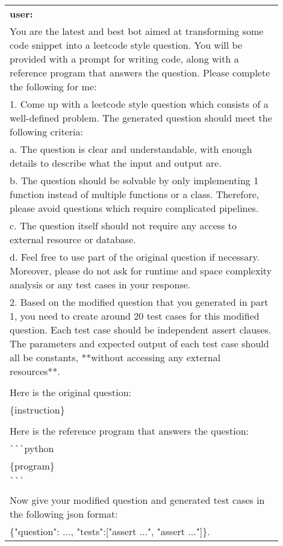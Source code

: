 \begin{table*}[h]
\begin{tabular}{|p{0.9\linewidth}|}
\textbf{user:}\\
You are the latest and best bot aimed at transforming some code snippet into a leetcode style question. You will be provided with a prompt for writing code, along with a reference program that answers the question. Please complete the following for me:\\
1. Come up with a leetcode style question which consists of a well-defined problem. The generated question should meet the following criteria:\\
\quad a. The question is clear and understandable, with enough details to describe what the input and output are.\\
\quad b. The question should be solvable by only implementing 1 function instead of multiple functions or a class. Therefore, please avoid questions which require complicated pipelines.\\
\quad c. The question itself should not require any access to external resource or database.\\
\quad d. Feel free to use part of the original question if necessary. Moreover, please do not ask for runtime and space complexity analysis or any test cases in your response. \\
2. Based on the modified question that you generated in part 1, you need to create around 20 test cases for this modified question. Each test case should be independent assert clauses. The parameters and expected output of each test case should all be constants, **without accessing any external resources**. \\
\\
Here is the original question: \\
\{instruction\} \\
\\
Here is the reference program that answers the question: \\
\verb|```|python \\
\{program\} \\
\verb|```| \\
\\
Now give your modified question and generated test cases in the following json format: \\
\{"question": ..., "tests":["assert ...", "assert ..."]\}.
\\ \hline
\end{tabular}
\end{table*}


